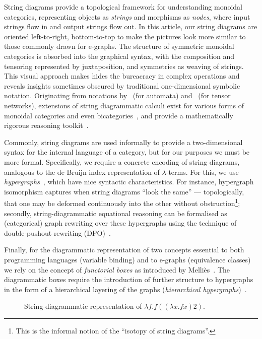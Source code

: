 String diagrams provide a topological framework for understanding monoidal categories, representing objects as \emph{strings} and morphisms as \emph{nodes}, where input strings flow in and output strings flow out.
In this article, our string diagrams are oriented left-to-right, bottom-to-top to make the pictures look more similar to those commonly drawn for e-graphs.
The structure of symmetric monoidal categories is absorbed into the graphical syntax, with the composition and tensoring represented by juxtaposition, and symmetries as weaving of strings.
This visual approach makes hides the bureacracy in complex operations and reveals insights sometimes obscured by traditional one-dimensional symbolic notation.
Originating from notations by~\citet{hotzsd} (for automata) and~\citet{penrose1984spinors} (for tensor networks), extensions of string diagrammatic calculi exist for various forms of monoidal categories and even bicategories~\cite{Selinger_2010}, and provide a mathematically rigorous reasoning toolkit~\cite{joyal_geometry_1991}.

Commonly, string diagrams are used informally to provide a two-dimensional syntax for the internal language of a category, but for our purposes we must be more formal.
Specifically, we require a concrete encoding of string diagrams, analogous to the de Bruijn index representation of $\lambda$-terms.
For this, we use \emph{hypergraphs}~\cite{bonchi_string_2022-1}, which have nice syntactic characteristics.
For instance, hypergraph isomorphism captures when string diagrams \enquote{look the same} --- topologically, that one may be deformed continuously into the other without obstruction\footnote{This is the informal notion of the \enquote{isotopy of string diagrams}.}; secondly, string-diagrammatic equational reasoning can be formalised as (categorical) graph rewriting over these hypergraphs using the technique of double-pushout rewriting (DPO)~\cite{1011453502719}.

Finally, for the diagrammatic representation of two concepts essential to both programming languages (variable binding) and to e-graphs (equivalence classes) we rely on the concept of \emph{functorial boxes} as introduced by Melli\`es~\cite{10.1007/11874683_1}.
The diagrammatic boxes require the introduction of further structure to hypergraphs in the form of a hierarchical layering of the graphs (\emph{hierarchical hypergraphs})~\cite{fscd}.

\begin{figure}
	\centering
	\caption{String-diagrammatic representation of $\lambda f . f ((\lambda x . f x) 2)$.}\label{fig:de-brujin-string}
\end{figure}

